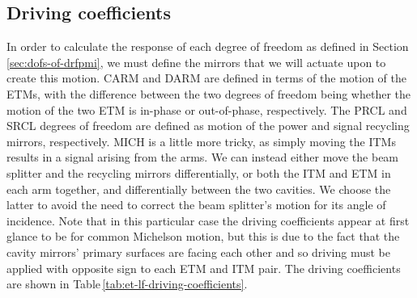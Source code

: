 \subsection{Driving coefficients}
In order to calculate the response of each degree of freedom as defined in Section\,\ref{sec:dofs-of-drfpmi}, we must define the mirrors that we will actuate upon to create this motion. \gls{CARM} and \gls{DARM} are defined in terms of the motion of the \glspl{ETM}, with the difference between the two degrees of freedom being whether the motion of the two \gls{ETM} is in-phase or out-of-phase, respectively. The \gls{PRCL} and \gls{SRCL} degrees of freedom are defined as motion of the power and signal recycling mirrors, respectively. \gls{MICH} is a little more tricky, as simply moving the \glspl{ITM} results in a signal arising from the arms. We can instead either move the beam splitter and the recycling mirrors differentially, or both the \gls{ITM} and \gls{ETM} in each arm together, and differentially between the two cavities. We choose the latter to avoid the need to correct the beam splitter's motion for its angle of incidence. Note that in this particular case the driving coefficients appear at first glance to be for common Michelson motion, but this is due to the fact that the cavity mirrors' primary surfaces are facing each other and so driving must be applied with opposite sign to each \gls{ETM} and \gls{ITM} pair. The driving coefficients are shown in Table\,\ref{tab:et-lf-driving-coefficients}.

